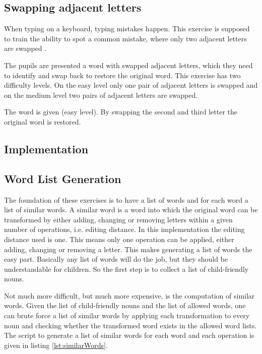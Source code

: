 \subsection*{Swapping adjacent letters}
\label{subsection:swappingLetters}

When typing on a keyboard, typing mistakes happen. This exercise is supposed to train the ability to spot a common mistake, where only two adjacent letters are swapped \cite{EinfachInformatik}.

The pupils are presented a word with swapped adjacent letters, which they need to identify and swap back to restore the original word. This exercise has two difficulty levels. On the easy level only one pair of adjacent letters is swapped and on the medium level two pairs of adjacent letters are swapped.

\begin{example}
    The word  is given (easy level). By swapping the second and third letter the original word  is restored.
\end{example}

\subsection{Implementation}

\subsection*{Word List Generation}

The foundation of these exercises is to have a list of words and for each word a list of similar words. A similar word is a word into which the original word can be transformed by either adding, changing or removing letters within a given number of operations, i.e. editing distance. In this implementation the editing distance used is one. This means only one operation can be applied, either adding, changing or removing a letter. This makes generating a list of words the easy part. Basically any list of words will do the job, but they should be understandable for children. So the first step is to collect a list of child-friendly nouns. 

Not much more difficult, but much more expensive, is the computation of similar words. Given the list of child-friendly nouns and the list of allowed words, one can brute force a list of similar words by applying each transformation to every noun and checking whether the transformed word exists in the allowed word lists. The script to generate a list of similar words for each word and each operation is given in listing \ref{lst:similarWords}.

